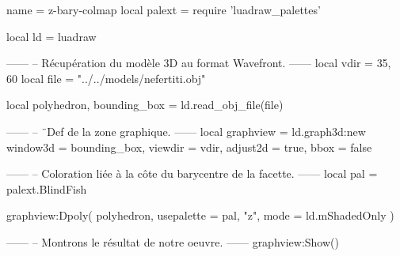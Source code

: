 \documentclass[border = 3pt]{standalone}
\begin{document}
\begin{luadraw*}{name = z-bary-colmap}
local palext = require 'luadraw_palettes'

local ld = luadraw

------
-- Récupération du modèle 3D au format Wavefront.
------
local vdir = {35, 60}
local file = "../../models/nefertiti.obj"

local polyhedron, bounding_box = ld.read_obj_file(file)

------
-- ¨Def de la zone graphique.
------
local graphview = ld.graph3d:new{
  window3d = bounding_box,
  viewdir  = vdir,
  adjust2d = true,
  bbox     = false
}

------
-- Coloration liée à la côte du barycentre de la facette.
------
local pal = palext.BlindFish

graphview:Dpoly(
  polyhedron,
  {
    usepalette = {pal, "z"},
    mode       = ld.mShadedOnly
  }
)

------
-- Montrons le résultat de notre oeuvre.
------
graphview:Show()
\end{luadraw*}
\end{document}

